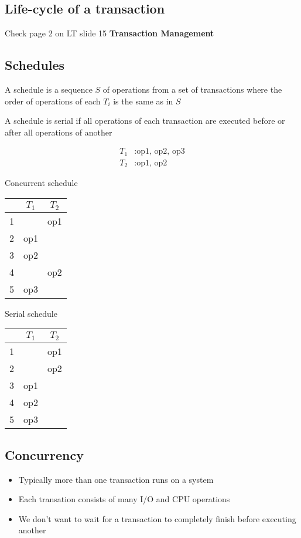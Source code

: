 \documentclass{article}
\begin{document}
\subsection{Life-cycle of a transaction}
Check page 2 on LT slide 15 \textbf{Transaction Management}
\subsection{Schedules}
A schedule is a sequence $S$ of operations from a set of transactions
where the order of operations of each $T_i$ is the same as in $S$

A schedule is serial if all operations of each transaction are executed before or after all operations of another

\begin{multicols}{3}
  \[\begin{split}
      T_1&: \text{op1, op2, op3}\\
      T_2&: \text{op1, op2}
    \end{split}\]
  \newline
  \begin{center}
    Concurrent schedule
    \begin{tabular}{c|c|c}
        & $T_1$ & $T_2$ \\ \hline
      1 &       & op1   \\
      2 & op1   &       \\
      3 & op2   &       \\
      4 &       & op2   \\
      5 & op3   &
    \end{tabular}
  \end{center}
  \begin{center}
    Serial schedule
    \begin{tabular}{c|c|c}
        & $T_1$ & $T_2$ \\ \hline
      1 &       & op1   \\
      2 &       & op2   \\
      3 & op1   &       \\
      4 & op2   &       \\
      5 & op3   &
    \end{tabular}
  \end{center}
\end{multicols}

\subsection{Concurrency}
\begin{itemize}
  \item Typically more than one transaction runs on a system
  \item Each transation consists of many I/O and CPU operations
  \item We don’t want to wait for a transaction to completely finish before executing another
\end{itemize}
\end{document}
